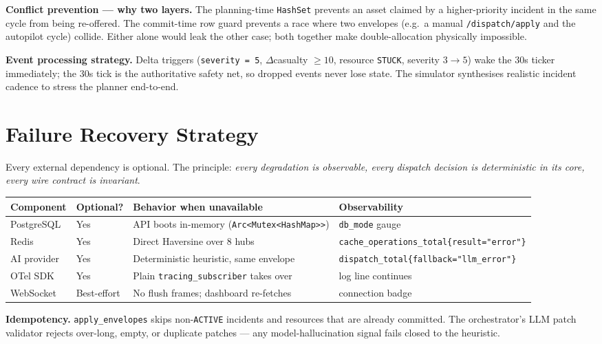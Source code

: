 \documentclass[10pt,letterpaper]{article}
\begin{document}
\noindent\textbf{Conflict prevention --- why two layers.} The planning-time \texttt{HashSet} prevents an asset claimed by a higher-priority incident in the same cycle from being re-offered. The commit-time row guard prevents a race where two envelopes (e.g.\ a manual \texttt{/dispatch/apply} and the autopilot cycle) collide. Either alone would leak the other case; both together make double-allocation physically impossible.

\noindent\textbf{Event processing strategy.} Delta triggers (\texttt{severity = 5}, $\Delta$casualty $\geq 10$, resource \texttt{STUCK}, severity $3 \rightarrow 5$) wake the 30s ticker immediately; the 30s tick is the authoritative safety net, so dropped events never lose state. The simulator synthesises realistic incident cadence to stress the planner end-to-end.

\section{Failure Recovery Strategy}
Every external dependency is optional. The principle: \emph{every degradation is observable, every dispatch decision is deterministic in its core, every wire contract is invariant}.

\begin{center}
\renewcommand{\arraystretch}{1.15}
\footnotesize
\begin{tabularx}{\textwidth}{@{}lXlX@{}}
\toprule
\textbf{Component} & \textbf{Optional?} & \textbf{Behavior when unavailable} & \textbf{Observability}\\
\midrule
PostgreSQL & Yes & API boots in-memory (\texttt{Arc<Mutex<HashMap>>}) & \texttt{db\_mode} gauge\\
Redis & Yes & Direct Haversine over 8 hubs & \texttt{cache\_operations\_total\{result="error"\}}\\
AI provider & Yes & Deterministic heuristic, same envelope & \texttt{dispatch\_total\{fallback="llm\_error"\}}\\
OTel SDK & Yes & Plain \texttt{tracing\_subscriber} takes over & log line continues\\
WebSocket & Best-effort & No flush frames; dashboard re-fetches & connection badge\\
\bottomrule
\end{tabularx}
\end{center}

\noindent\textbf{Idempotency.} \texttt{apply\_envelopes} skips non-\texttt{ACTIVE} incidents and resources that are already committed. The orchestrator's LLM patch validator rejects over-long, empty, or duplicate patches --- any model-hallucination signal fails closed to the heuristic.
\end{document}
